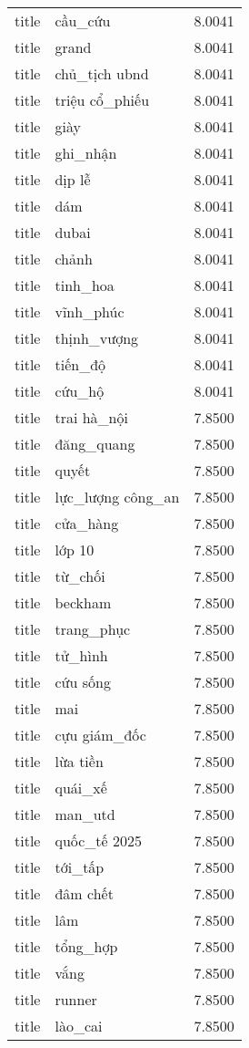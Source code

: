 \documentclass{article}
\begin{document}
\begin{tabular}{lll}
title & cầu\_cứu & 8.0041\\
title & grand & 8.0041\\
title & chủ\_tịch ubnd & 8.0041\\
title & triệu cổ\_phiếu & 8.0041\\
title & giày & 8.0041\\
title & ghi\_nhận & 8.0041\\
title & dịp lễ & 8.0041\\
title & dám & 8.0041\\
title & dubai & 8.0041\\
title & chảnh & 8.0041\\
title & tinh\_hoa & 8.0041\\
title & vĩnh\_phúc & 8.0041\\
title & thịnh\_vượng & 8.0041\\
title & tiến\_độ & 8.0041\\
title & cứu\_hộ & 8.0041\\
title & trai hà\_nội & 7.8500\\
title & đăng\_quang & 7.8500\\
title & quyết & 7.8500\\
title & lực\_lượng công\_an & 7.8500\\
title & cửa\_hàng & 7.8500\\
title & lớp 10 & 7.8500\\
title & từ\_chối & 7.8500\\
title & beckham & 7.8500\\
title & trang\_phục & 7.8500\\
title & tử\_hình & 7.8500\\
title & cứu sống & 7.8500\\
title & mai & 7.8500\\
title & cựu giám\_đốc & 7.8500\\
title & lừa tiền & 7.8500\\
title & quái\_xế & 7.8500\\
title & man\_utd & 7.8500\\
title & quốc\_tế 2025 & 7.8500\\
title & tới\_tấp & 7.8500\\
title & đâm chết & 7.8500\\
title & lâm & 7.8500\\
title & tổng\_hợp & 7.8500\\
title & vắng & 7.8500\\
title & runner & 7.8500\\
title & lào\_cai & 7.8500\\

\end{tabular}
\end{document}
